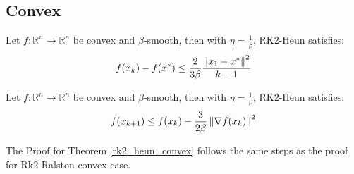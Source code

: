 

\subsection{Convex}
\begin{theorem} \label{rk2_heun_convex}
Let $f : \mathbb{R}^{n} \rightarrow \mathbb{R}^{n} $ be convex and $\beta$-smooth, then with $\eta = \frac{1}{\beta}$, RK2-Heun satisfies:
\begin{align*}
f(x_{k}) - f(x^{*}) \leq  \frac{2}{3 \beta} \frac{\left\lVert x_{1} - x^{*}\right\rVert^{2}}{k - 1}
\end{align*}
\end{theorem}

\begin{lemma} \label{rk2_heun_convex_lemma}
Let $f : \mathbb{R}^{n} \rightarrow \mathbb{R}^{n} $ be convex and $\beta$-smooth, then with $\eta = \frac{1}{\beta}$, RK2-Heun satisfies:
\begin{align}
f(x_{k + 1}) \leq f(x_{k}) - \frac{3}{2 \beta } \left\lVert\nabla f(x_k)\right\rVert^{2}
\end{align}
\end{lemma}

The Proof for Theorem \ref{rk2_heun_convex} follows the same steps as the proof for Rk2 Ralston convex case.

